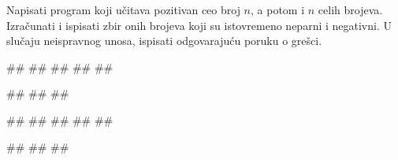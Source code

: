 \begin{Exercise}[label=PET_13] 
Napisati program koji učitava pozitivan ceo broj $n$, a potom i $n$ celih
brojeva. Izračunati i ispisati zbir onih brojeva koji su istovremeno neparni i
negativni.
U slučaju neispravnog unosa, ispisati odgovarajuću poruku o grešci.

\begin{miditest}
\begin{upotreba}{1}
#\naslovInt#
##
##
##
##
\end{upotreba}
\end{miditest}
\begin{miditest}
\begin{upotreba}{2}
#\naslovInt#
##
##
\end{upotreba}
\end{miditest}

\begin{miditest}
\begin{upotreba}{3}
#\naslovInt#
##
##
##
##
\end{upotreba}
\end{miditest}
\begin{miditest}
\begin{upotreba}{4}
#\naslovInt#
##
##
\end{upotreba}
\end{miditest}

\end{Exercise}
\ifresenja
\begin{Answer}[ref=PET_13]
\end{Answer}
\fi


